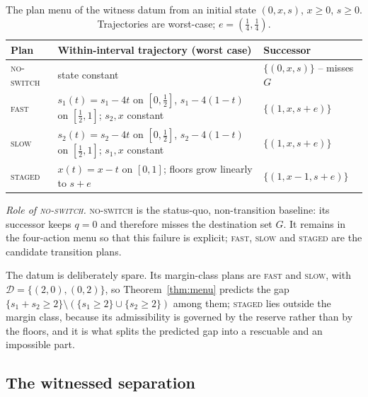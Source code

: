 \documentclass[preprint,11pt,authoryear]{elsarticle}
\theoremstyle{definition}
\theoremstyle{remark}
\newcommand{\act}[1]{\textsc{#1}}
\begin{document}
\begin{table}[!htbp]
\centering\small
\caption{The plan menu of the witness datum from an initial state $(0,x,s)$, $x\ge0$, $s\ge0$. Trajectories are worst-case; $e=(\tfrac14,\tfrac14)$.}
\label{tab:actions}
\begin{tabularx}{\textwidth}{@{}lXl@{}}
\toprule
Plan & Within-interval trajectory (worst case) & Successor \\
\midrule
\act{no-switch} & state constant & $\{(0,x,s)\}$ -- misses $G$ \\
\act{fast} & $s_1(t)=s_1-4t$ on $[0,\tfrac12]$, $s_1-4(1-t)$ on $[\tfrac12,1]$; $s_2,x$ constant & $\{(1,x,s+e)\}$ \\
\act{slow} & $s_2(t)=s_2-4t$ on $[0,\tfrac12]$, $s_2-4(1-t)$ on $[\tfrac12,1]$; $s_1,x$ constant & $\{(1,x,s+e)\}$ \\
\act{staged} & $x(t)=x-t$ on $[0,1]$; floors grow linearly to $s+e$ & $\{(1,x-1,s+e)\}$ \\
\bottomrule
\end{tabularx}
\end{table}

\noindent\textit{Role of \act{no-switch}.} \act{no-switch} is the status-quo, non-transition baseline: its successor keeps $q=0$ and therefore misses the destination set $G$. It remains in the four-action menu so that this failure is explicit; \act{fast}, \act{slow} and \act{staged} are the candidate transition plans.

The datum is deliberately spare. Its margin-class plans are \act{fast} and \act{slow}, with $\mathcal D=\{(2,0),(0,2)\}$, so Theorem~\ref{thm:menu} predicts the gap $\{s_1+s_2\ge2\}\setminus(\{s_1\ge2\}\cup\{s_2\ge2\})$ among them; \act{staged} lies outside the margin class, because its admissibility is governed by the reserve rather than by the floors, and it is what splits the predicted gap into a rescuable and an impossible part.

\subsection{The witnessed separation}
\end{document}
